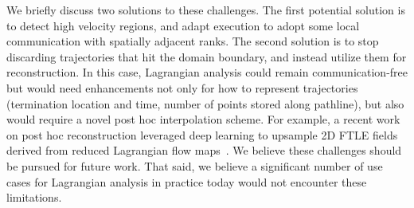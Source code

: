 We briefly discuss two solutions to these challenges.
%
The first potential solution is to detect high velocity regions, and adapt execution to adopt some local communication with spatially adjacent ranks.
%
%
%
The second solution is to stop discarding trajectories that hit the domain boundary, and instead utilize them for reconstruction. 
%
In this case, Lagrangian analysis could remain communication-free but would need enhancements not only for how to represent trajectories (termination location and time, number of points stored along pathline), but also would require a novel post hoc interpolation scheme.
%
For example, a recent work on post hoc reconstruction leveraged deep learning to upsample 2D FTLE fields derived from reduced Lagrangian flow maps~\cite{jakob2020fluid}.
%
%
%
We believe these challenges should be pursued for future work. 
%
That said, we believe a significant number of use cases for Lagrangian analysis in practice today would not encounter these limitations. 
